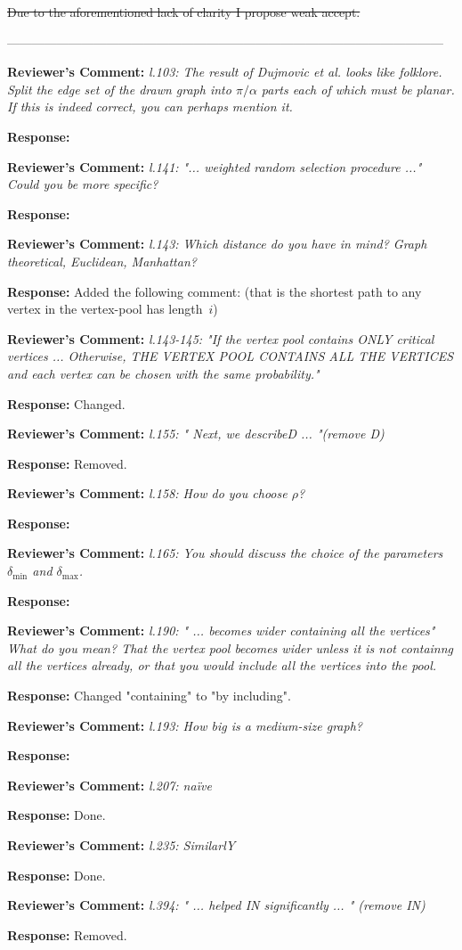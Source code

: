 \documentclass{article}
\newcommand{\rcomment}[1]{\vspace{0.3cm} \item \textbf{Reviewer's Comment:} {\em #1}}
\newcommand{\tcomment}[1]{\vspace{0.3cm} {\color{red} \item \textbf{Reviewer's Comment:} {\em #1}}}
\newcommand{\response}{\vspace{0.2cm} \textbf{Response: }}
\begin{document}
\st{Due to the aforementioned lack of clarity I propose weak accept.}


---------------------------------------------------------------------------------------------------------

\begin{itemize}

\tcomment{l.103: The result of Dujmovic et al. looks like folklore. Split the edge set of the drawn graph into $\pi/\alpha$ parts each of which must be planar. If this is indeed correct, you can perhaps mention it.}

\response{}

\tcomment{l.141: "... weighted random selection procedure ..." Could you be more specific?}

\response{}

\rcomment{l.143: Which distance do you have in mind? Graph theoretical, Euclidean, Manhattan?}

\response{Added the following comment: (that is the shortest path to any vertex in the vertex-pool has length~$i$)}

\rcomment{l.143-145: "If the vertex pool contains ONLY critical vertices ... Otherwise, THE VERTEX POOL CONTAINS ALL THE VERTICES and each vertex can be chosen with the same probability." }

\response{Changed.}

\rcomment{l.155: " Next, we describeD ...  "(remove D)}

\response{Removed.}

\tcomment{l.158: How do you choose $\rho$?}

\response{}

\tcomment{l.165: You should discuss the choice of the parameters $\delta_{\min}$ and $\delta_{\max} $.}

\response{}

\rcomment{l.190: " ... becomes wider containing all the vertices" What do you mean?  That the vertex pool becomes wider unless it is not containng all the vertices already, or that you would include all the vertices into the pool.}

\response{Changed "containing" to "by including".}

\tcomment{l.193: How big is a medium-size graph?}

\response{}

\rcomment{l.207: na\"ive}

\response{Done.}

\rcomment{l.235: SimilarlY}

\response{Done.}

\rcomment{l.394: " ... helped IN significantly ... " (remove IN)}

\response{Removed.}

\end{itemize}
\newpage
\end{document}
